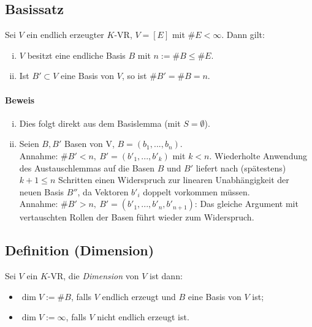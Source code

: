  \subsection{Basissatz}
 	\begin{Satz}[Basissatz]
 		Sei $V$ ein endlich erzeugter $K$-VR, $V=[E]$ mit $\#E < \infty$. Dann gilt:
 		\begin{enumerate}[(i)]
 			\item $V$ besitzt eine endliche Basis $B$ mit $n:= \#B \leq \#E$.
 			\item Ist $B'\subset V$ eine Basis von $V$, so ist $\#B' = \#B = n$.
 		\end{enumerate}
 	\end{Satz}

 	\paragraph{Beweis}
 		\begin{enumerate}[(i)]
 			\item  Dies folgt direkt aus dem Basislemma (mit $S=\emptyset$).
 			\item Seien $B,B'$ Basen von V, $B = (b_1,...,b_n)$.\\
 			      Annahme: $\#B' < n,\ B' = (b'_1,...,b'_k)$ mit $k < n$. Wiederholte Anwendung des Austauschlemmas auf die Basen $B$ und $B'$ liefert nach (spätestens) $k+1\leq n$ Schritten einen Widerspruch zur linearen Unabhängigkeit der neuen Basis $B''$, da Vektoren $b'_i$ doppelt vorkommen müssen.\\
 			      Annahme: $\#B' > n,\ B' = (b'_1,...,b'_n,b'_{n+1})$: Das gleiche Argument mit vertauschten Rollen der Basen führt wieder zum Widerspruch.
 		\end{enumerate}

 \subsection{Definition (Dimension)}
 	\begin{Definition}[Dimension]
 		Sei $V$ ein $K$-VR, die \emph{Dimension} von $ V $ ist dann:
 		\begin{itemize}
 			\item $\dim V:= \#B$, falls $ V $ endlich erzeugt und $B$ eine Basis von $V$ ist;
 			\item $\dim V:= \infty$, falls $V$ nicht endlich erzeugt ist.
 		\end{itemize}
 	\end{Definition}

